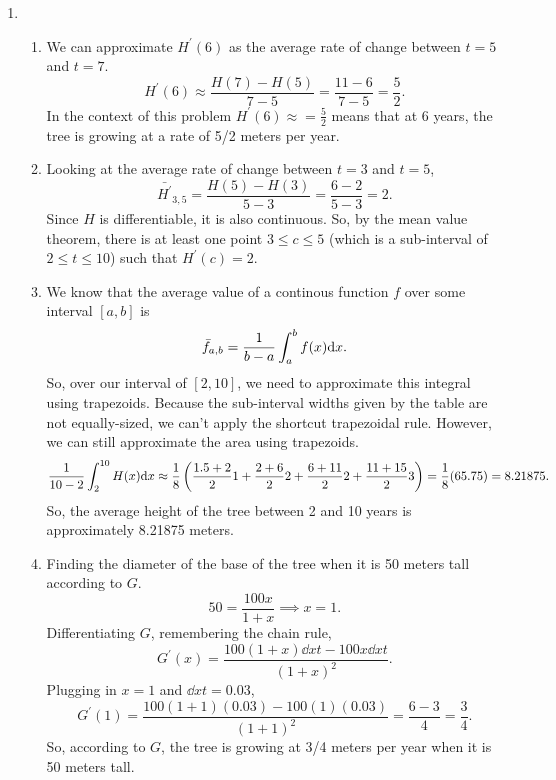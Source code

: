 \begin{enumerate}
	\item \begin{enumerate}
		\item We can approximate $H^\prime(6)$ as the average rate of change between $t=5$ and $t=7$.
			\begin{equation*}
				H^\prime(6) \approx \frac{H(7)-H(5)}{7-5} = \frac{11-6}{7-5} = \frac{5}{2}.
			\end{equation*}
			In the context of this problem $H^\prime(6) \approx = \frac{5}{2}$ means that at 6 years, the tree is growing at a rate of 5/2 meters per year.
		\item Looking at the average rate of change between $t=3$ and $t=5$,
			\begin{equation*}
				\bar{H^\prime}_{3,5} = \frac{H(5)-H(3)}{5-3} = \frac{6-2}{5-3} = 2.
			\end{equation*}
			Since $H$ is differentiable, it is also continuous.
			So, by the mean value theorem, there is at least one point $3 \leq c \leq 5$ (which is a sub-interval of $2 \leq t \leq 10$) such that $H^\prime(c) = 2$. 
		\item We know that the average value of a continous function $f$ over some interval $[a,b]$ is
			\begin{equation*}
				\bar{f}_{a,b} = \frac{1}{b-a}\int_{a}^{b}{f(x)\mathrm{d} x}.
			\end{equation*}
			So, over our interval of $[2,10]$, we need to approximate this integral using trapezoids.
			Because the sub-interval widths given by the table are not equally-sized, we can't apply the shortcut trapezoidal rule.
			However, we can still approximate the area using trapezoids.
			\begin{equation*}
				\frac{1}{10-2}\int_{2}^{10}{H(x)\mathrm{d} x} \approx \frac{1}{8}\left(\frac{1.5+2}{2}1+\frac{2+6}{2}2+\frac{6+11}{2}2+\frac{11+15}{2}3\right) = \frac{1}{8}(65.75) = 8.21875.
			\end{equation*}
			So, the average height of the tree between 2 and 10 years is approximately 8.21875 meters.
		\item Finding the diameter of the base of the tree when it is 50 meters tall according to $G$.
			\begin{equation*}
				50 = \frac{100x}{1+x} \implies x = 1.
			\end{equation*}
			Differentiating $G$, remembering the chain rule,
			\begin{equation*}
				G^\prime(x) = \frac{100(1+x)\dd{x}{t} - 100x\dd{x}{t}}{(1+x)^2}.
			\end{equation*}
			Plugging in $x=1$ and $\dd{x}{t}=0.03$,
			\begin{equation*}
				G^\prime(1) = \frac{100(1+1)(0.03) - 100(1)(0.03)}{(1+1)^2} = \frac{6-3}{4} = \frac{3}{4}.
			\end{equation*}
			So, according to $G$, the tree is growing at 3/4 meters per year when it is 50 meters tall.
	\end{enumerate}


\end{enumerate}
